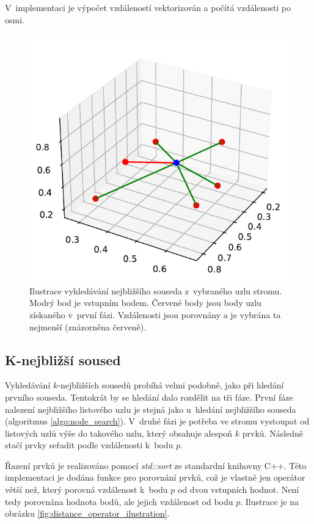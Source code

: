 V~implementaci je výpočet vzdáleností vektorizován a počítá vzdálenosti po osmi. 




\begin{figure}
    \centering
    \includegraphics[scale=0.6]{obrazky-figures/hashtree/distance.pdf}
    \caption{Ilustrace vyhledávání nejbližšího souseda z~vybraného uzlu stromu. Modrý bod je vstupním bodem. Červené body jsou body uzlu získaného v~první fázi. Vzdálenosti jsou porovnány a je vybrána ta nejmenší (znázorněna červeně).}
    \label{fig:distance_ilustration}
\end{figure}


\subsection*{K-nejbližší soused}
Vyhledávání $k$-nejbližších sousedů probíhá velmi podobně, jako při hledání prvního souseda. Tentokrát by se hledání dalo rozdělit na tři fáze. První fáze nalezení nejbližšího listového uzlu je stejná jako u~hledání nejbližšího souseda (algoritmus \ref{algo:node_search}). V~druhé fázi je potřeba ve stromu vystoupat od listových uzlů výše do takového uzlu, který obsahuje alespoň $k$ prvků. Následně stačí prvky seřadit podle vzdálenosti k~bodu $p$.

Řazení prvků je realizováno pomocí \emph{std::sort} ze standardní knihovny C++. Této implementaci je dodána funkce pro porovnání prvků, což je vlastně jen operátor větší než, který porovná vzdálenost k~bodu $p$ od dvou vstupních hodnot. Není tedy porovnána hodnota bodů, ale jejich vzdálenost od bodu $p$. Ilustrace je na obrázku \ref{fig:distance_operator_ilustration}.


